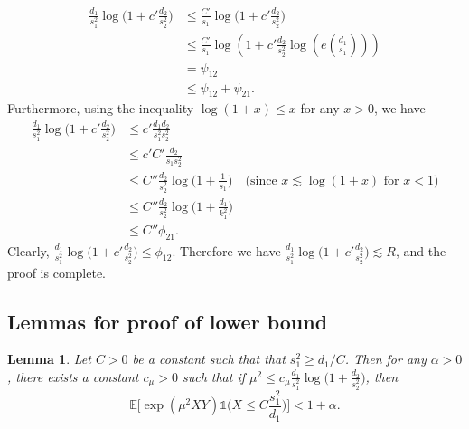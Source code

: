 \documentclass{article}
\newcommand{\EE}{\mathbb{E}}
\newcommand{\one}{\mathds{1}}
\newtheorem{lemma}{Lemma}
\theoremstyle{remark}
\begin{document}
\begin{align*}
    \frac{d_1}{s_1^2}\log\big(1 + c'\frac{d_2}{s_2^2}\big) &\leq \frac{C'}{s_1}\log\big(1 + c'\frac{d_2}{s_2^2}\big) \\
    &\leq  \frac{C'}{s_1}\log\left(1 + c'\frac{d_2}{s_2^2}\log \left(e {d_1 \choose s_1}\right)\right) \\
    &= \psi_{12} \\
    &\leq \psi_{12} + \psi_{21}.
\end{align*}
Furthermore, using the inequality $\log(1 + x) \leq x$ for any $x > 0$, we have
\begin{align*}
    \frac{d_1}{s_1^2}\log\big(1 + c'\frac{d_2}{s_2^2}\big) 
    &\leq c'\frac{d_1d_2}{s_1^2s_2^2} \\
    &\leq c' C' \frac{d_2}{s_1s_2^2} \\
    &\leq C''\frac{d_2}{s_2^2}\log\Big(1 + \frac{1}{s_1}\Big) \quad \text{(since $x \lesssim \log(1 + x)$ for $x < 1$)}\\
    &\leq C''\frac{d_2}{s_2^2}\log\Big(1 + \frac{d_1}{k^2_1}\Big) \\
    &\leq C'' \phi_{21}.
\end{align*}
Clearly, $\frac{d_1}{s_1^2}\log\big(1 + c'\frac{d_2}{s_2^2}\big) \leq \phi_{12}$. Therefore we have $\frac{d_1}{s_1^2}\log\big(1 + c'\frac{d_2}{s_2^2}\big) \lesssim R$, and the proof is complete.

\subsection{Lemmas for proof of lower bound}\label{sec_lemmas_lb}

\begin{lemma}\label{lemma:lb-principal-term}
    Let $C > 0$ be a constant such that that $s_1^2 \geq d_1 / C$. Then for any $\alpha > 0$, there exists a constant $c_{\mu} > 0$ such that  if $\mu^2 \leq c_{\mu}\frac{d_1}{s_1^2}\log\big(1 + \frac{d_2}{s_2^2}\big)$, then
    \[\EE\Big[\exp(\mu^2XY)\one\big(X \leq C \frac{s_1^2}{d_1}\big)\Big] < 1 + \alpha.\]
\end{lemma}
\end{document}
